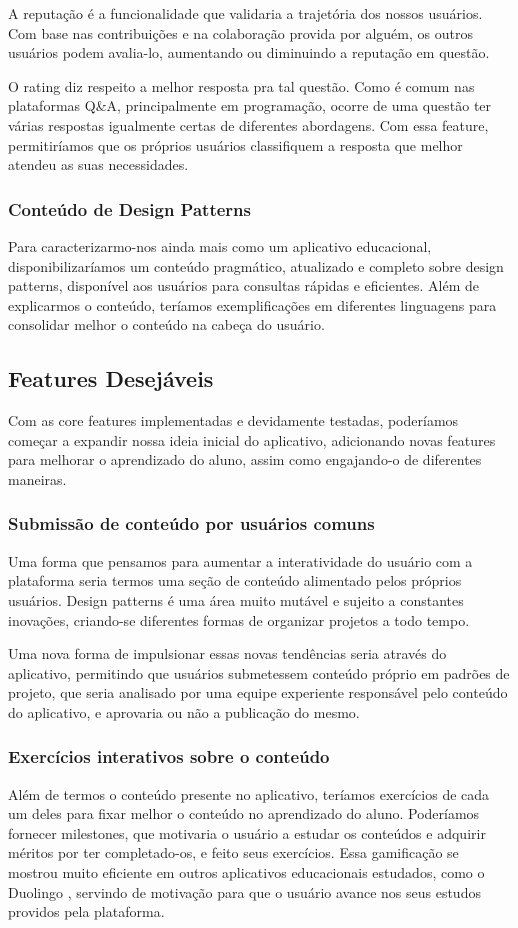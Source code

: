 A reputação é a funcionalidade que validaria a trajetória dos nossos usuários. Com base nas contribuições e na colaboração provida por alguém, os outros usuários podem avalia-lo, aumentando ou diminuindo a reputação em questão. 

O rating diz respeito a melhor resposta pra tal questão. Como é comum nas plataformas Q\&A, principalmente em programação, ocorre de uma questão ter várias respostas igualmente certas de diferentes abordagens. Com essa feature, permitiríamos que os próprios usuários classifiquem a resposta que melhor atendeu as suas necessidades.

\subsubsection{Conteúdo de Design Patterns}
Para caracterizarmo-nos ainda mais como um aplicativo educacional, disponibilizaríamos um conteúdo pragmático, atualizado e completo sobre design patterns, disponível aos usuários para consultas rápidas e eficientes. Além de explicarmos o conteúdo, teríamos exemplificações em diferentes linguagens para consolidar melhor o conteúdo na cabeça do usuário.

\subsection{Features Desejáveis}
Com as core features implementadas e devidamente testadas, poderíamos começar a expandir nossa ideia inicial do aplicativo, adicionando novas features para melhorar o aprendizado do aluno, assim como engajando-o de diferentes maneiras.

\subsubsection{Submissão de conteúdo por usuários comuns}
Uma forma que pensamos para aumentar a interatividade do usuário com a plataforma seria termos uma seção de conteúdo alimentado pelos próprios usuários. Design patterns é uma área muito mutável e sujeito a constantes inovações, criando-se diferentes formas de organizar projetos a todo tempo. 

Uma nova forma de impulsionar essas novas tendências seria através do aplicativo, permitindo que usuários submetessem conteúdo próprio em padrões de projeto, que seria analisado por uma equipe experiente responsável pelo conteúdo do aplicativo, e aprovaria ou não a publicação do mesmo.

\subsubsection{Exercícios interativos sobre o conteúdo}
Além de termos o conteúdo presente no aplicativo, teríamos exercícios de cada um deles para fixar melhor o conteúdo no aprendizado do aluno. Poderíamos fornecer milestones, que motivaria o usuário a estudar os conteúdos e adquirir méritos por ter completado-os, e feito seus exercícios. Essa gamificação se mostrou muito eficiente em outros aplicativos educacionais estudados, como o Duolingo \cite{duolingo}, servindo de motivação para que o usuário avance nos seus estudos providos pela plataforma.


